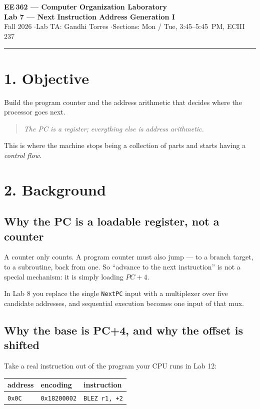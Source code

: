 \documentclass[11pt]{article}
\newcommand{\code}[1]{\texttt{#1}}
\newcommand{\hr}{\vspace{2pt}\hrule\vspace{6pt}}
\begin{document}
\begin{center}
{\Large\bfseries EE\,362 --- Computer Organization Laboratory}\\[2pt]
{\large\bfseries Lab 7 --- Next Instruction Address Generation I}\\[4pt]
Fall 2026 \quad$\cdot$\quad Lab TA: Gandhi Torres \quad$\cdot$\quad Sections: Mon / Tue, 3:45--5:45~PM, ECIII 237
\end{center}
\hr

\section*{1. Objective}

Build the program counter and the address arithmetic that decides where the
processor goes next.

\begin{quote}
\emph{The PC is a register; everything else is address arithmetic.}
\end{quote}

This is where the machine stops being a collection of parts and starts having a
\emph{control flow}.

\section*{2. Background}

\subsection*{Why the PC is a loadable register, not a counter}

A counter only counts. A program counter must also jump --- to a branch target,
to a subroutine, back from one. So ``advance to the next instruction'' is not a
special mechanism: it is simply loading $PC+4$.

In Lab 8 you replace the single \code{NextPC} input with a multiplexer over five
candidate addresses, and sequential execution becomes one input of that mux.

\subsection*{Why the base is PC+4, and why the offset is shifted}

Take a real instruction out of the program your CPU runs in Lab 12:

\begin{center}
\begin{tabular}{lll}
\toprule
address & encoding & instruction \\
\midrule
\code{0x0C} & \code{0x18200002} & \code{BLEZ r1, +2} \\
\bottomrule
\end{tabular}
\end{center}
\end{document}
